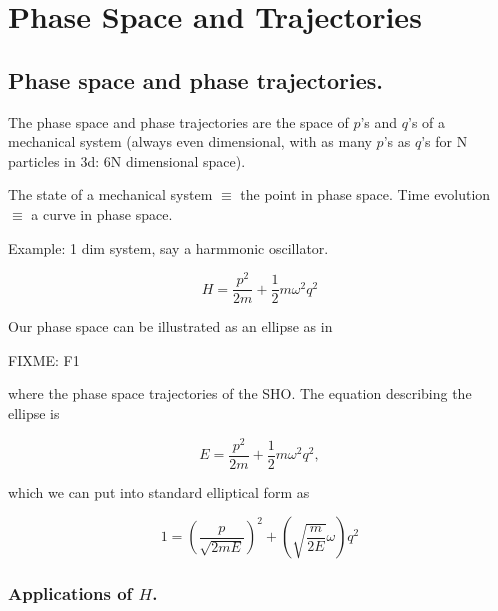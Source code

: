 
%

\chapter{Phase Space and Trajectories}
\label{chap:phaseSpaceAndTrajectories}
{}
\date{Feb 29, 2012}

\beginArtWithToc

\section{Phase space and phase trajectories.}

The phase space and phase trajectories are the space of $p$'s and $q$'s of a mechanical system (always even dimensional, with as many $p$'s as $q$'s for N particles in 3d: 6N dimensional space).

The state of a mechanical system $\equiv$ the point in phase space.
Time evolution $\equiv$ a curve in phase space.

Example: 1 dim system, say a harmmonic oscillator.

\begin{equation}\label{eqn:phaseSpaceAndTrajectories:n}
H = \frac{p^2}{2m} + \frac{1}{2} m \omega^2 q^2
\end{equation}

Our phase space can be illustrated as an ellipse as in

FIXME: F1

where the phase space trajectories of the SHO.  The equation describing the ellipse is

\begin{equation}\label{eqn:phaseSpaceAndTrajectories:n}
E = \frac{p^2}{2m} + \frac{1}{2} m \omega^2 q^2,
\end{equation}

which we can put into standard elliptical form as

\begin{equation}\label{eqn:phaseSpaceAndTrajectories:n}
1 = \left( \frac{p}{\sqrt{2 m E}}\right)^2 + \left(\sqrt{\frac{m}{2 E}} \omega\right) q^2
\end{equation}

\subsection{Applications of $H$.}

